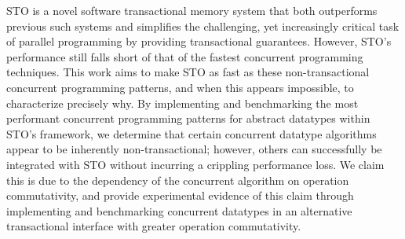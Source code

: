 STO is a novel software transactional memory system that both outperforms previous such systems and simplifies the challenging, yet increasingly critical task of parallel programming by providing transactional guarantees. However, STO's performance still falls short of that of the fastest concurrent programming techniques. This work aims to make STO as fast as these non-transactional concurrent programming patterns, and when this appears impossible, to characterize precisely why. By implementing and benchmarking the most performant concurrent programming patterns for abstract datatypes within STO's framework, we determine that certain concurrent datatype algorithms appear to be inherently non-transactional; however, others can successfully be integrated with STO without incurring a crippling performance loss. We claim this is due to the dependency of the concurrent algorithm on operation commutativity, and provide experimental evidence of this claim through implementing and benchmarking concurrent datatypes in an alternative transactional interface with greater operation commutativity.
